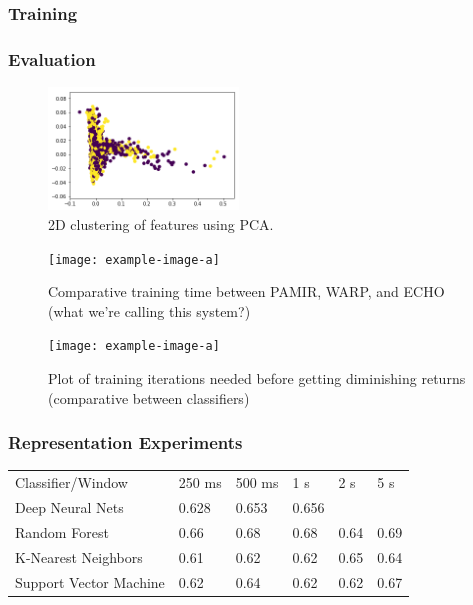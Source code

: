 \subsubsection{Training}

\subsubsection{Evaluation}

\begin{figure}[h]
    \centering
    \includegraphics[width=0.45\textwidth]{figures/pca-cluster-hl.png}
    \caption{2D clustering of features using PCA.}
    \label{fig:pcahl}
\end{figure}


\begin{figure}
    \centering
    \texttt{[image: example-image-a]}
    \caption{Comparative training time between PAMIR, WARP, and ECHO (what we're calling this system?)}
    \label{fig:my-label}
\end{figure}

\begin{figure}
    \centering
    \texttt{[image: example-image-a]}
    \caption{Plot of training iterations needed before getting diminishing returns (comparative between classifiers)}
    \label{fig:learning-curve}
\end{figure}

\subsubsection{Representation Experiments}

\begin{table}[]
    \begin{tabular}{llllll}
    Classifier/Window       & 250 ms & 500 ms & 1 s   & 2 s  & 5 s   \\
    Deep Neural Nets        & 0.628  & 0.653  & 0.656 &      &       \\
    Random Forest           & 0.66   & 0.68   & 0.68  & 0.64 & 0.69  \\
    K-Nearest Neighbors     & 0.61   & 0.62   & 0.62  & 0.65 & 0.64 \\
    Support Vector Machine  & 0.62   & 0.64   & 0.62  & 0.62 & 0.67   
    \end{tabular}
\end{table}

